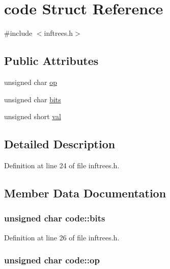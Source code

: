 \hypertarget{structcode}{\section{code Struct Reference}
\label{structcode}
}


{\ttfamily \#include $<$inftrees.\-h$>$}

\subsection*{Public Attributes}
\begin{DoxyCompactItemize}
\item 
unsigned char \hyperlink{structcode_a4f075d73a9177d05cc7d332105295b83}{op}
\item 
unsigned char \hyperlink{structcode_a5defcebb356dca1a5a8d39995f28d66b}{bits}
\item 
unsigned short \hyperlink{structcode_a6f9c73627997e8fc6df02e620cf9a6f5}{val}
\end{DoxyCompactItemize}


\subsection{Detailed Description}


Definition at line 24 of file inftrees.\-h.



\subsection{Member Data Documentation}
\hypertarget{structcode_a5defcebb356dca1a5a8d39995f28d66b}{
\subsubsection[{bits}]{\setlength{\rightskip}{0pt plus 5cm}unsigned char code\-::bits}}\label{structcode_a5defcebb356dca1a5a8d39995f28d66b}


Definition at line 26 of file inftrees.\-h.

\hypertarget{structcode_a4f075d73a9177d05cc7d332105295b83}{
\subsubsection[{op}]{\setlength{\rightskip}{0pt plus 5cm}unsigned char code\-::op}}\label{structcode_a4f075d73a9177d05cc7d332105295b83}


